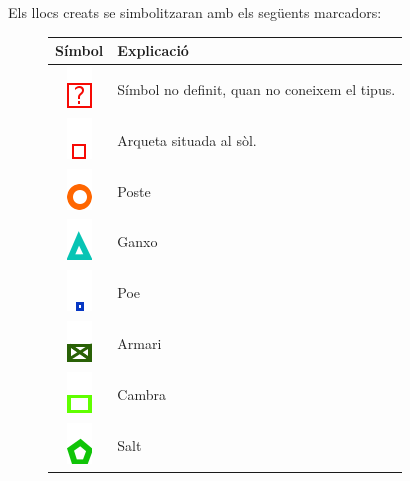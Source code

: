 \documentclass[a4paper]{article}
\begin{document}
	Els llocs creats se simbolitzaran amb els següents marcadors:
	\begin{figure}[H]
		\centering
		\begin{tabular}{|c|p{5cm}|} \hline
			\textbf{Símbol} & \textbf{Explicació} \\ \hline
			\includegraphics{images/simbols/notdefined.png} & Símbol no definit, quan no coneixem el tipus. \\ \hline
			\includegraphics{images/simbols/manhole.png} & Arqueta situada al sòl. \\ \hline
			\includegraphics{images/simbols/pole.png} & Poste \\ \hline
			\includegraphics{images/simbols/hook.png} & Ganxo \\ \hline
			\includegraphics{images/simbols/poe.png} & Poe \\ \hline
			\includegraphics{images/simbols/cabinet.png} & Armari \\ \hline
			\includegraphics{images/simbols/room.png} & Cambra \\ \hline
			\includegraphics{images/simbols/jump.png} & Salt \\ \hline
		\end{tabular}
	\end{figure}
	
\end{document}
